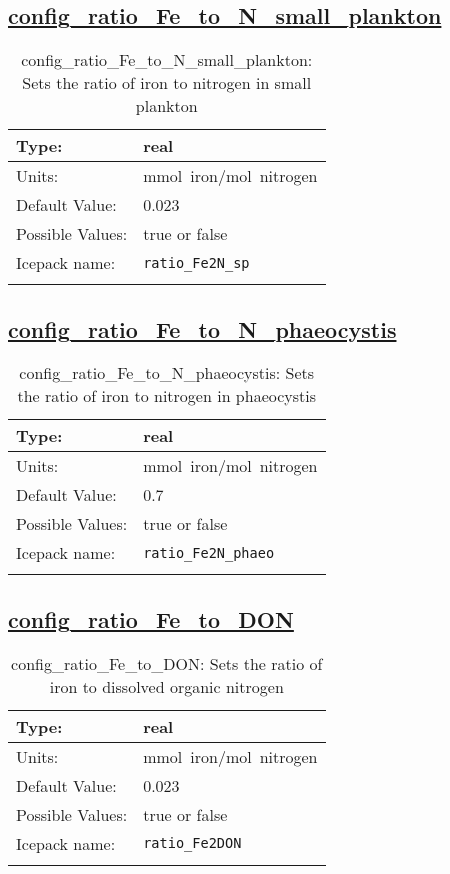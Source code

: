 \subsection[config\_ratio\_Fe\_to\_N\_small\_plankton]{\hyperref[sec:nm_tab_biogeochemistry]{config\_ratio\_Fe\_to\_N\_small\_plankton}}
\label{subsec:nm_sec_config_ratio_Fe_to_N_small_plankton}
\begin{center}
\begin{longtable}{| p{2.0in} || p{4.0in} |}
    \hline
    Type: & real \\
    \hline
    Units: & \si{mmol.iron/mol.nitrogen} \\
    \hline
    Default Value: & 0.023 \\
    \hline
    Possible Values: & true or false \\
    \hline
    \hline
    Icepack name: & \verb+ratio_Fe2N_sp+ \\
    \caption{config\_ratio\_Fe\_to\_N\_small\_plankton: Sets the ratio of iron to nitrogen in small plankton}
\end{longtable}
\end{center}
\subsection[config\_ratio\_Fe\_to\_N\_phaeocystis]{\hyperref[sec:nm_tab_biogeochemistry]{config\_ratio\_Fe\_to\_N\_phaeocystis}}
\label{subsec:nm_sec_config_ratio_Fe_to_N_phaeocystis}
\begin{center}
\begin{longtable}{| p{2.0in} || p{4.0in} |}
    \hline
    Type: & real \\
    \hline
    Units: & \si{mmol.iron/mol.nitrogen} \\
    \hline
    Default Value: & 0.7 \\
    \hline
    Possible Values: & true or false \\
    \hline
    \hline
    Icepack name: & \verb+ratio_Fe2N_phaeo+ \\
    \caption{config\_ratio\_Fe\_to\_N\_phaeocystis: Sets the ratio of iron to nitrogen in phaeocystis}
\end{longtable}
\end{center}
\subsection[config\_ratio\_Fe\_to\_DON]{\hyperref[sec:nm_tab_biogeochemistry]{config\_ratio\_Fe\_to\_DON}}
\label{subsec:nm_sec_config_ratio_Fe_to_DON}
\begin{center}
\begin{longtable}{| p{2.0in} || p{4.0in} |}
    \hline
    Type: & real \\
    \hline
    Units: & \si{mmol.iron/mol.nitrogen} \\
    \hline
    Default Value: & 0.023 \\
    \hline
    Possible Values: & true or false \\
    \hline
    \hline
    Icepack name: & \verb+ratio_Fe2DON+ \\
    \caption{config\_ratio\_Fe\_to\_DON: Sets the ratio of iron to dissolved organic nitrogen}
\end{longtable}
\end{center}

